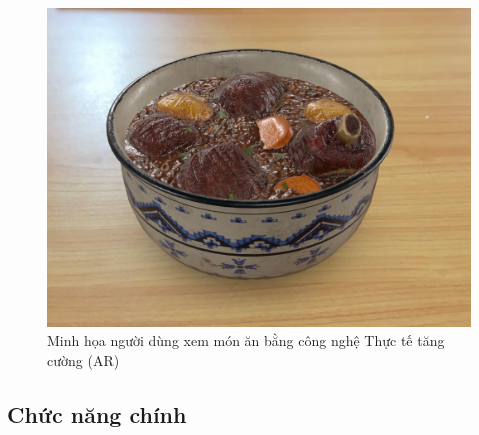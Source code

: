 \documentclass[12pt,a4paper]{article}
\begin{document}
\begin{figure}[H]
    \centering
    \includegraphics[width=\textwidth]{../images/minh_hoa_ar_mon_an.png} %
    \caption{Minh họa người dùng xem món ăn bằng công nghệ Thực tế tăng cường (AR)}
    \label{fig:ar_food_view}
\end{figure}

\subsection{Chức năng chính}
\end{document}
